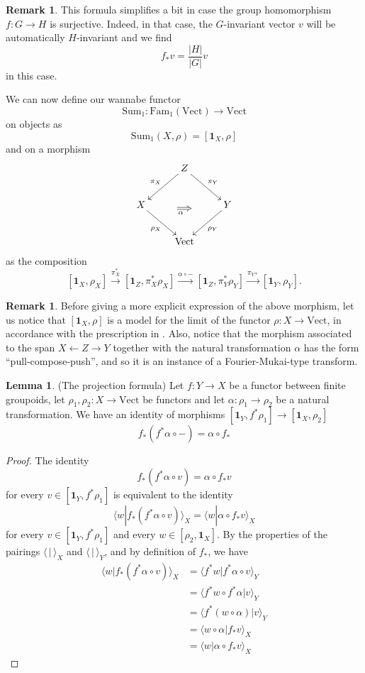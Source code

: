 \documentclass[12pt]{scrartcl}
\theoremstyle{definition}
\newtheorem{lemma}[definition]{Lemma}
\newtheorem{remark}[definition]{Remark}
\numberwithin{equation}{section}
\numberwithin{definition}{section}
\numberwithin{figure}{section}
\begin{document}
\begin{remark}
This formula simplifies a bit in case the group homomorphism $f\colon G\to H$ is surjective. Indeed, in that case, the $G$-invariant vector $v$ will be automatically $H$-invariant and we find
\[
f_*v=\frac{|H|}{|G|} v
\]
in this case.
\end{remark}

We can now define our wannabe functor
\[
\mathrm{Sum}_1\colon \mathrm{Fam}_1(\mathrm{Vect})\to \mathrm{Vect}
\]
on objects as 
\[
\mathrm{Sum}_1(X,\rho)=[\mathbf{1}_X,\rho]
\]
and on a morphism 
\[
\xymatrix{
&Z\ar[dl]_{\pi_X}\ar[dr]^{\pi_Y}&\\
X\ar[dr]_{\rho_X}&&Y\ar[dl]^{\rho_Y}\\
&\mathrm{Vect}
\ar@{=>}_{\alpha\phantom{m}}(13,-14);(18,-14)
}
\]
as the composition
\[
[\mathbf{1}_X,\rho_X]\xrightarrow{\pi_X^*} [\mathbf{1}_Z,\pi_X^*\rho_X]\xrightarrow{\alpha\circ-}  [\mathbf{1}_Z,\pi_Y^*\rho_Y] \xrightarrow{\pi_{Y*}} [\mathbf{1}_Y,\rho_Y].
\]

\begin{remark}
Before giving a more explicit expression of the above morphism, let us notice that $[\mathbf{1}_X,\rho]$ is a model for the limit of the functor $\rho\colon X\to \mathrm{Vect}$, in accordance with the prescription in \cite{FHLT}. Also, notice that the morphism associated to the span $X\leftarrow Z\to Y$ together with the natural transformation $\alpha$ has the form ``pull-compose-push'', and so it is an instance of a Fourier-Mukai-type transform.
\end{remark}



\begin{lemma} (The projection formula)
\label{lem:projectionformula}
Let $f\colon Y\to X$ be a functor between finite groupoids, let $\rho_1,\rho_2\colon X\to \mathrm{Vect}$ be functors and let $\alpha\colon \rho_1\to\rho_2$ be a natural transformation. We have an identity of morphisms $[\mathbf{1}_Y,f^*\rho_1]\to [\mathbf{1}_X,\rho_2]$
\[
f_*(f^*\alpha\circ -) = \alpha\circ f_*
\] 
\end{lemma}
\begin{proof}
The identity
\[
f_*(f^*\alpha\circ v) = \alpha\circ f_*v
\]
for every $v\in [\mathbf{1}_Y,f^*\rho_1]$ is equivalent to the identity
\[
\langle w| f_*(f^*\alpha\circ v)\rangle_X = \langle w|\alpha\circ f_*v\rangle_X
\]
for every $v\in [\mathbf{1}_Y,f^*\rho_1]$ and every $w\in [\rho_2,\mathbf{1}_X]$. By the properties of the pairings $\langle\,|\,\rangle_X$ and $\langle\,|\,\rangle_Y$, and by definition of $f_*$, we have
\begin{align*}
\langle w| f_*(f^*\alpha\circ v)\rangle_X&=\langle f^*w| f^*\alpha\circ v\rangle_Y\\
&=\langle f^*w\circ f^*\alpha| v\rangle_Y\\
&=\langle f^*(w\circ \alpha)| v\rangle_Y\\
&=\langle w\circ \alpha| f_*v\rangle_X\\
&=\langle w| \alpha \circ f_*v\rangle_X
\end{align*}
\end{proof}
\end{document}
